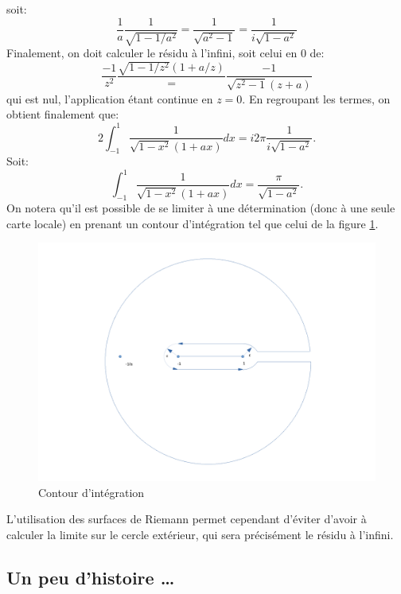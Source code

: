 soit:
\[
\frac{1}{a}\frac{1}{\sqrt{1-1/a^2}} = \frac{1}{\sqrt{a^2-1}} = \frac{1}{i\sqrt{1-a^2}} 
\]
Finalement, on doit calculer le résidu à l'infini, soit celui en 0 de:
\[
\frac{-1}{z^2}\frac{\sqrt{1-1/z^2}(1+a/z)} = \frac{-1}{\sqrt{z^2-1}(z+a)}
\]
qui est nul, l'application étant continue en $z = 0$.
En regroupant les termes, on obtient finalement que:
\[
2 \int_{-1}^1 \frac{1}{\sqrt{1-x^2}(1+ax)} dx = i 2 \pi \frac{1}{i\sqrt{1-a^2}}.
\]
Soit:
\[
\int_{-1}^1 \frac{1}{\sqrt{1-x^2}(1+ax)} dx = \frac{\pi}{\sqrt{1-a^2}}.
\]
On notera qu'il est possible de se limiter à une détermination (donc à une seule carte locale) en prenant un contour d'intégration tel que celui de la figure \ref{fig:contour_riemann_infty}. 
\begin{figure}[h!]
    \centering
    \includegraphics[scale=0.4]{images/contour_riemann_infty.pdf}
    \caption{Contour d'intégration}
    \label{fig:contour_riemann_infty}
\end{figure}
L'utilisation des surfaces de Riemann permet cependant d'éviter d'avoir à calculer la limite sur le cercle extérieur, qui sera précisément le résidu à l'infini.

\newpage 
\subsection*{Un peu d'histoire \dots}

